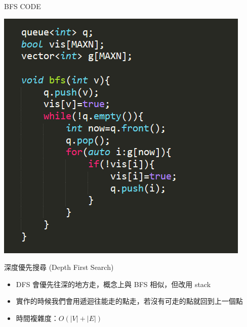 \documentclass[aspectratio=169]{beamer}
\begin{document}
    
    \begin{frame}{BFS CODE}
        \begin{center}
            \includegraphics[scale=0.7]{code/bfs_code.png}
        \end{center}
    \end{frame}
    
    
    \begin{frame}{深度優先搜尋 (Depth First Search)}
        \begin{itemize}
            \item DFS 會優先往深的地方走，概念上與 BFS 相似，但改用 stack
            \item 實作的時候我們會用遞迴往能走的點走，若沒有可走的點就回到上一個點
            \item 時間複雜度：$O(|V|+|E|)$
        \end{itemize}
    \end{frame}
    
\end{document}
